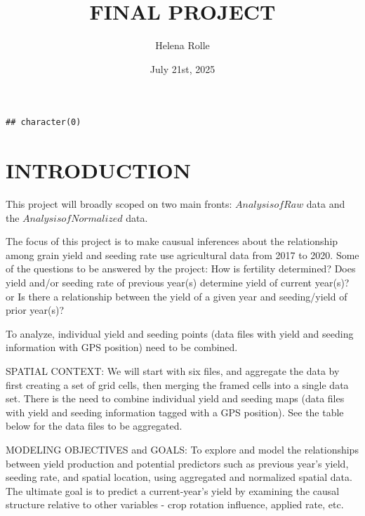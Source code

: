 \documentclass[
]{article}
\title{FINAL PROJECT}
\author{Helena Rolle}
\date{July 21st, 2025}
\newenvironment{Shaded}{\begin{snugshade}}{\end{snugshade}}
\newcommand{\AttributeTok}[1]{\textcolor[rgb]{0.13,0.29,0.53}{#1}}
\newcommand{\FunctionTok}[1]{\textcolor[rgb]{0.13,0.29,0.53}{\textbf{#1}}}
\newcommand{\NormalTok}[1]{#1}
\newcommand{\SpecialCharTok}[1]{\textcolor[rgb]{0.81,0.36,0.00}{\textbf{#1}}}
\newcommand{\StringTok}[1]{\textcolor[rgb]{0.31,0.60,0.02}{#1}}
\begin{document}
\maketitle

\begin{Shaded}
\end{Shaded}

\begin{verbatim}
## character(0)
\end{verbatim}

\section{INTRODUCTION}\label{introduction}

This project will broadly scoped on two main fronts: \(Analysis of Raw\)
data and the \(Analysis of Normalized\) data.

The focus of this project is to make causual inferences about the
relationship among grain yield and seeding rate use agricultural data
from 2017 to 2020. Some of the questions to be answered by the project:
How is fertility determined? Does yield and/or seeding rate of previous
year(s) determine yield of current year(s)? or Is there a relationship
between the yield of a given year and seeding/yield of prior year(s)?

To analyze, individual yield and seeding points (data files with yield
and seeding information with GPS position) need to be combined.

SPATIAL CONTEXT: We will start with six files, and aggregate the data by
first creating a set of grid cells, then merging the framed cells into a
single data set. There is the need to combine individual yield and
seeding maps (data files with yield and seeding information tagged with
a GPS position). See the table below for the data files to be
aggregated.

MODELING OBJECTIVES and GOALS: To explore and model the relationships
between yield production and potential predictors such as previous
year's yield, seeding rate, and spatial location, using aggregated and
normalized spatial data. The ultimate goal is to predict a
current-year's yield by examining the causal structure relative to other
variables - crop rotation influence, applied rate, etc.
\end{document}
